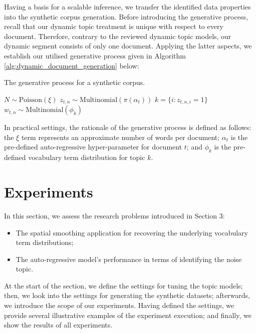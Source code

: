 \documentclass{mpaper}
\begin{document}
\par Having a basis for a scalable inference, we transfer the identified data properties into the synthetic corpus generation. Before introducing the generative process, recall that our dynamic topic treatment is unique with respect to every document. Therefore, contrary to the reviewed dynamic topic models, our dynamic segment consists of only one document. Applying the latter aspects, we establish our utilised generative process given in Algorithm \ref{alg:dynamic_document_generation} below:
\begin{algorithm}[H]
\caption{The generative process for a synthetic corpus.}
\label{alg:dynamic_document_generation}
\begin{algorithmic}[2]
\State $N \sim \mbox{Poisson}(\xi)$
\State $z_{t, n} \sim \mbox{Multinomial}(\pi(\alpha_t))$
\State $k = \{i : z_{t, n, i} = 1\}$
\State $w_{t, n} \sim \mbox{Multinomial}(\phi_k)$
\EndFor
\EndFor
\end{algorithmic}
\end{algorithm}
In practical settings, the rationale of the generative process is defined as follows: the $\xi$ term represents an approximate number of words per document; $\alpha_t$ is the pre-defined auto-regressive hyper-parameter for document $t$; and $\phi_k$ is the pre-defined vocabulary term distribution for topic $k$.

 \section{Experiments}

\par In this section, we assess the research problems introduced in Section 3:
\begin{itemize}
	\item The spatial smoothing application for recovering the underlying vocabulary term distributions;
	\item The auto-regressive model's performance in terms of identifying the noise topic.
\end{itemize}
At the start of the section, we define the settings for tuning the topic models; then, we look into the settings for generating the synthetic datasets; afterwards, we introduce the scope of our experiments. Having defined the settings, we provide several illustrative examples of the experiment execution; and finally, we show the results of all experiments.
\end{document}
